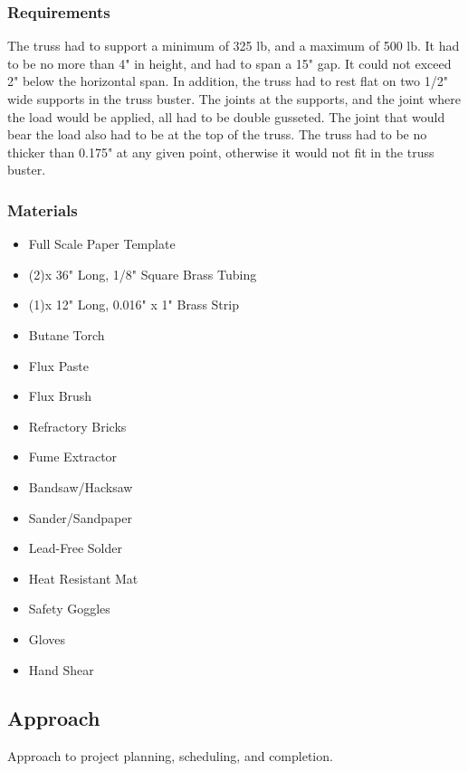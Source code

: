 \documentclass{article}
\let\Oldsubsection\subsection
\renewcommand{\subsection}{\FloatBarrier\Oldsubsection}
\let\Oldsubsubsection\subsubsection
\renewcommand{\subsubsection}{\FloatBarrier\Oldsubsubsection}
\begin{document}
  \subsubsection{Requirements}
  
  The truss had to support a minimum of 325 lb, and a maximum of 500 lb. It had to be no more than 4" in height, and had to span a 15" gap. It could not exceed 2" below the horizontal span. In addition, the truss had to rest flat on two 1/2" wide supports in the truss buster. The joints at the supports, and the joint where the load would be applied, all had to be double gusseted. The joint that would bear the load also had to be at the top of the truss. The truss had to be no thicker than 0.175" at any given point, otherwise it would not fit in the truss buster. 
  
  \subsubsection{Materials}
  \begin{itemize}
  \item Full Scale Paper Template
  \item (2)x 36" Long, 1/8" Square Brass Tubing
  \item (1)x 12" Long, 0.016" x 1" Brass Strip
  \item Butane Torch
  \item Flux Paste
  \item Flux Brush
  \item Refractory Bricks
  \item Fume Extractor
  \item Bandsaw/Hacksaw
  \item Sander/Sandpaper
  \item Lead-Free Solder
  \item Heat Resistant Mat
  \item Safety Goggles
  \item Gloves
  \item Hand Shear
  \end{itemize}
  
  \subsection{Approach}
  
  Approach to project planning, scheduling, and completion.
  
\end{document}
